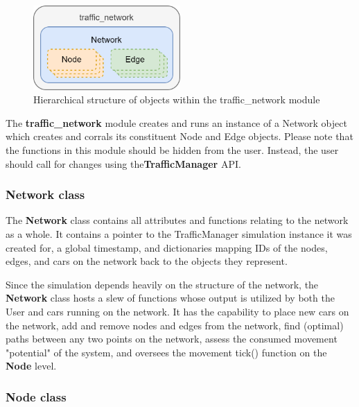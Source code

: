 \begin{figure}[H]
    \centering
	\includegraphics[width=0.5\textwidth]{tex files/Figures/Revised_Network_Arch.png}
	\caption[Network Module:  traffic\_network]{Hierarchical structure of objects within the traffic\_network module }
	\label{fig:network_module}
\end{figure}

\par The \textbf{traffic\_network} module creates and runs an instance of a Network object which creates and corrals its constituent Node and Edge objects.  Please note that the functions in this module should be hidden from the user.  Instead, the user should call for changes using the\textbf{TrafficManager} API. \\

\subsubsection{Network class}

\par The \textbf{Network} class contains all attributes and functions relating to the network as a whole.  It contains a pointer to the TrafficManager simulation instance it was created for, a global timestamp, and dictionaries mapping IDs of the nodes, edges, and cars on the network back to the objects they represent. \\

\par Since the simulation depends heavily on the structure of the network, the \textbf{Network} class hosts a slew of functions whose output is utilized by both the User and cars running on the network.  It has the capability to place new cars on the network, add and remove nodes and edges from the network, find (optimal) paths between any two points on the network, assess the consumed movement "potential" of the system, and oversees the movement tick() function on the \textbf{Node} level. \\

\subsubsection{Node class}

